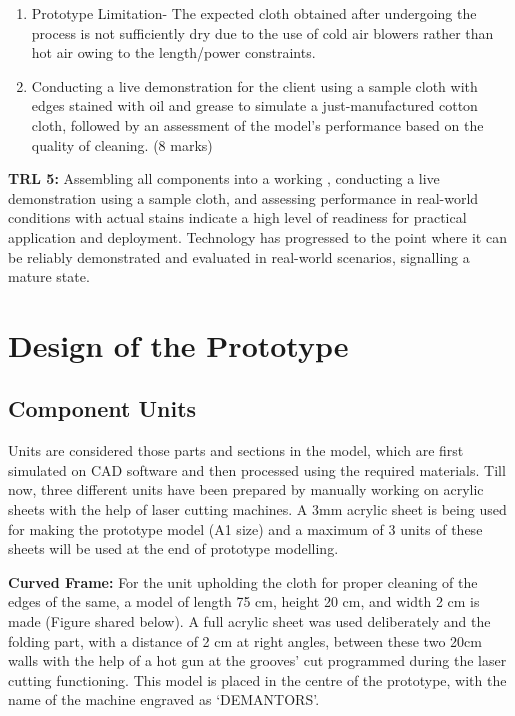 \documentclass[table,french,english]{rapportCS}
\begin{document}
\begin{enumerate}[label=\arabic*.]
\item Prototype Limitation-
The expected cloth obtained after undergoing the process is not sufficiently dry due to the use of cold air blowers rather than hot air owing to the length/power constraints.
\item Conducting a live demonstration for the client using a sample cloth with edges stained with oil and grease to simulate a just-manufactured cotton cloth, followed by an assessment of the model's performance based on the quality of cleaning. (8 marks)

\end{enumerate}

\textbf{TRL 5:} Assembling all components into a working  , conducting a live demonstration using a sample cloth, and assessing performance in real-world conditions with actual stains indicate a high level of readiness for practical application and deployment. Technology has progressed to the point where it can be reliably demonstrated and evaluated in real-world scenarios, signalling a mature state.

\section{Design of the Prototype}


\subsection{Component Units}
Units are considered those parts and sections in the model, which are first simulated on CAD software and then processed using the required materials. Till now, three different units have been prepared by manually working on acrylic sheets with the help of laser cutting machines. A 3mm acrylic sheet is being used for making the prototype model (A1 size) and a maximum of 3 units of these sheets will be used at the end of prototype modelling.

\vspace{0.8cm}
\textbf{Curved Frame:}
For the unit upholding the cloth for proper cleaning of the edges of the same, a model of length 75 cm, height 20 cm, and width 2 cm is made (Figure shared below).  A full acrylic sheet was used deliberately and the folding part, with a distance of 2 cm at right angles, between these two 20cm walls with the help of a hot gun at the grooves’ cut programmed during the laser cutting functioning. This model is placed in the centre of the prototype, with the name of the machine engraved as ‘DEMANTORS’.
\end{document}
